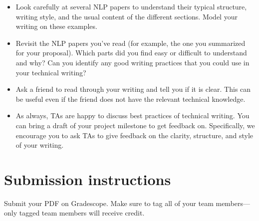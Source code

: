 \documentclass[11pt,a4paper]{article}
\begin{document}
\begin{itemize}[nosep]
    \item Look carefully at several NLP papers to understand their typical structure, writing style, and the usual content of the different sections. Model your writing on these examples.
    \item Revisit the NLP papers you've read (for example, the one you summarized for your proposal). Which parts did you find easy or difficult to understand and why? Can you identify any good writing practices that you could use in your technical writing?
    \item Ask a friend to read through your writing and tell you if it is clear. This can be useful even if the friend does not have the relevant technical knowledge.
    \item As always, TAs are happy to discuss best practices of technical writing. You can bring a draft of your project milestone to get feedback on. Specifically, we encourage you to ask TAs to give feedback on the clarity, structure, and style of your writing.
\end{itemize}


\section{Submission instructions}

Submit your PDF on Gradescope. Make sure to tag all of your team members---only tagged team members will receive credit.
\end{document}
